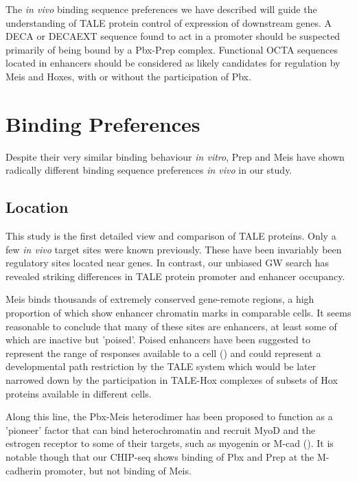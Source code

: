 The \textit{in vivo} binding sequence preferences we have  described will guide the understanding of \ac{TALE} protein control of expression of downstream genes. A \ac{DECA} or \ac{DECAEXT} sequence found to act in a promoter should be suspected primarily of being bound by a Pbx-Prep complex. Functional \ac{OCTA} sequences located in enhancers should be considered as likely candidates for regulation by Meis and Hoxes, with or without the participation of Pbx. 

\section{Binding Preferences}

Despite their very similar binding behaviour \textit{in vitro}, Prep and Meis have shown radically different binding sequence preferences \textit{in vivo} in our study. 

\subsection{Location}

This study is the first detailed view and comparison of \ac{TALE} proteins. Only a few \textit{in vivo} target sites were known previously. These have been invariably been regulatory sites located near genes. In contrast, our unbiased \ac{GW} search has revealed striking differences in \ac{TALE} protein promoter and enhancer occupancy. 

Meis binds thousands of extremely conserved gene-remote regions, a high proportion of which show enhancer chromatin marks in comparable cells. It seems reasonable to conclude that many of these sites are enhancers, at least some of which are inactive but 'poised'. Poised enhancers have been suggested to represent the range of responses available to a cell (\cite{Creyghton2010}) and could represent a developmental path restriction by the \ac{TALE} system which would be later narrowed down by the participation in \ac{TALE}-Hox complexes of subsets of Hox proteins available in different cells. 

Along this line, the Pbx-Meis heterodimer has been proposed to function as a 'pioneer' factor that can bind heterochromatin and recruit MyoD and the estrogen receptor to some of their targets, such as myogenin or M-cad (\cite{Berkes2004,Magnani2011}). It is notable though that our \ac{CHIP}-seq shows binding of Pbx and Prep at the M-cadherin promoter, but not binding of Meis. %

